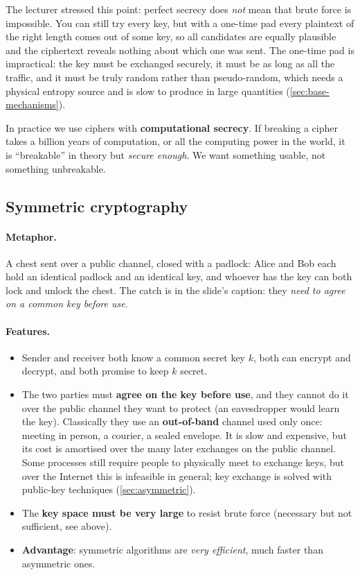 \begin{remark}
The lecturer stressed this point: perfect secrecy does \emph{not} mean that brute force is impossible. You can still try every key, but with a one-time pad every plaintext of the right length comes out of some key, so all candidates are equally plausible and the ciphertext reveals nothing about which one was sent. The one-time pad is impractical: the key must be exchanged securely, it must be as long as all the traffic, and it must be truly random rather than pseudo-random, which needs a physical entropy source and is slow to produce in large quantities (\cref{sec:base-mechanisms}).
\end{remark}

In practice we use ciphers with \textbf{computational secrecy}. If breaking a cipher takes a billion years of computation, or all the computing power in the world, it is \enquote{breakable} in theory but \emph{secure enough}. We want something usable, not something unbreakable.

\subsection{Symmetric cryptography}

\paragraph{Metaphor.} A chest sent over a public channel, closed with a padlock: Alice and Bob each hold an identical padlock and an identical key, and whoever has the key can both lock and unlock the chest. The catch is in the slide's caption: they \emph{need to agree on a common key before use}.

\paragraph{Features.}
\begin{itemize}
    \item Sender and receiver both know a common secret key $k$, both can encrypt and decrypt, and both promise to keep $k$ secret.
    \item The two parties must \textbf{agree on the key before use}, and they cannot do it over the public channel they want to protect (an eavesdropper would learn the key). Classically they use an \textbf{out-of-band} channel used only once: meeting in person, a courier, a sealed envelope. It is slow and expensive, but its cost is amortised over the many later exchanges on the public channel. Some processes still require people to physically meet to exchange keys, but over the Internet this is infeasible in general; key exchange is solved with public-key techniques (\cref{sec:asymmetric}).
    \item The \textbf{key space must be very large} to resist brute force (necessary but not sufficient, see above).
    \item \textbf{Advantage}: symmetric algorithms are \emph{very efficient}, much faster than asymmetric ones.
\end{itemize}

